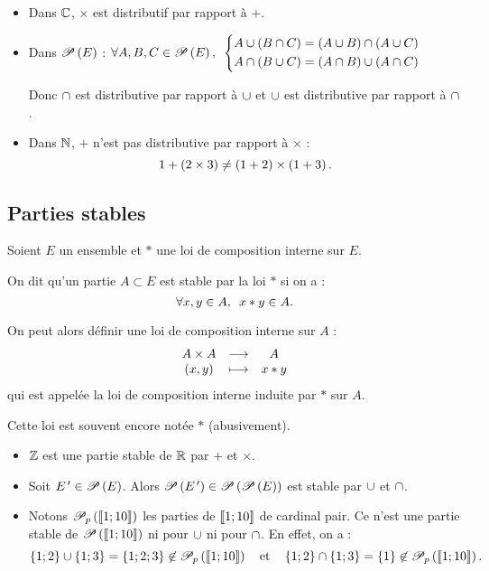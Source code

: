 \begin{ex}
\begin{itemize}
\item Dans \(\C\), \(\times\) est distributif par rapport à \(+\). \\

\item Dans \(\P{E}\) : \(\quantifs{\forall A,B,C\in\P{E}}\begin{dcases}A\union\paren{B\inter C}=\paren{A\union B}\inter\paren{A\union C} \\ A\inter\paren{B\union C}=\paren{A\inter B}\union\paren{A\inter C}\end{dcases}\)

Donc \(\inter\) est distributive par rapport à \(\union\) et \(\union\) est distributive par rapport à \(\inter\). \\

\item Dans \(\N\), \(+\) n'est pas distributive par rapport à \(\times\) : \[1+\paren{2\times3}\not=\paren{1+2}\times\paren{1+3}.\]
\end{itemize}
\end{ex}

\subsection{Parties stables}

\begin{defi}
Soient \(E\) un ensemble et \(*\) une loi de composition interne sur \(E\).

On dit qu'un partie \(A\subset E\) est stable par la loi \(*\) si on a : \[\quantifs{\forall x,y\in A}x*y\in A.\]

On peut alors définir une loi de composition interne sur \(A\) : \[\fonctionlambda{A\times A}{A}{\paren{x,y}}{x*y}\] qui est appelée la loi de composition interne induite par \(*\) sur \(A\).

Cette loi est souvent encore notée \(*\) (abusivement).
\end{defi}

\begin{ex}
\begin{itemize}
\item \(\Z\) est une partie stable de \(\R\) par \(+\) et \(\times\). \\

\item Soit \(E\prim\in\P{E}\). Alors \(\P{E\prim}\in\P{\P{E}}\) est stable par \(\union\) et \(\inter\). \\

\item Notons \(\mathscr{P}_p\paren{\interventierii{1}{10}}\) les parties de \(\interventierii{1}{10}\) de cardinal pair. Ce n'est une partie stable de \(\P{\interventierii{1}{10}}\) ni pour \(\union\) ni pour \(\inter\). En effet, on a : \[\accol{1;2}\union\accol{1;3}=\accol{1;2;3}\not\in\mathscr{P}_p\paren{\interventierii{1}{10}}\quad\text{et}\quad\accol{1;2}\inter\accol{1;3}=\accol{1}\not\in\mathscr{P}_p\paren{\interventierii{1}{10}}.\]
\end{itemize}
\end{ex}

